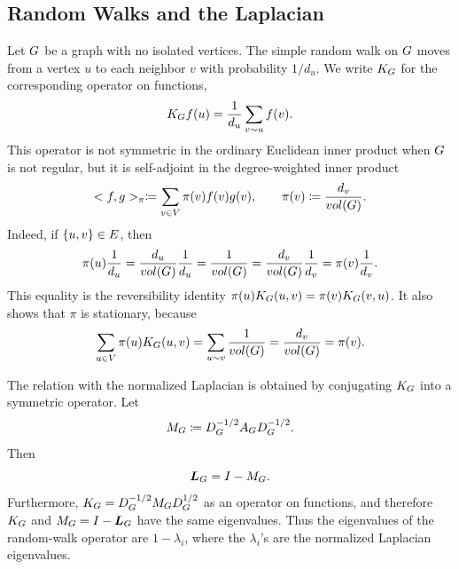 \subsection{Random Walks and the Laplacian}
\label{subsec:laplacian-random-walks}

Let \(G\) be a graph with no isolated vertices. The simple random walk on \(G\) moves from a vertex \(u\) to each neighbor \(v\) with probability \(1/d_u\). We write \(K_{G}\) for the corresponding operator on functions,
\begin{equation}
	K_{G} f(u)=\frac{1}{d_u}\sum_{v\sim u}f(v).
\end{equation}
This operator is not symmetric in the ordinary Euclidean inner product when \(G\) is not regular, but it is self-adjoint in the degree-weighted inner product
\begin{equation}
	< f,g>_{\pi}\coloneqq \sum_{v\in V}\pi(v)f(v)g(v),
	\qquad
	\pi(v)\coloneqq \frac{d_v}{vol(G)}.
\end{equation}
Indeed, if \(\{u,v\}\in E\), then
\begin{equation}
	\pi(u)\frac{1}{d_u}=\frac{d_u}{vol(G)}\frac{1}{d_u}=\frac{1}{vol(G)}=\frac{d_v}{vol(G)}\frac{1}{d_v}=\pi(v)\frac{1}{d_v}.
\end{equation}
This equality is the reversibility identity \(\pi(u)K_{G}(u,v)=\pi(v)K_{G}(v,u)\). It also shows that \(\pi\) is stationary, because
\begin{equation}
	\sum_{u\in V}\pi(u)K_{G}(u,v)
	=
	\sum_{u\sim v}\frac{1}{vol(G)}
	=
	\frac{d_v}{vol(G)}
	=
	\pi(v).
\end{equation}

The relation with the normalized Laplacian is obtained by conjugating \(K_{G}\) into a symmetric operator. Let
\begin{equation}
	M_{G}\coloneqq D_{G}^{-1/2}A_{G}D_{G}^{-1/2}.
\end{equation}
Then
\begin{equation}
	\boldsymbol{L}_{G}=I-M_{G}.
\end{equation}
Furthermore, \(K_{G}=D_{G}^{-1/2}M_{G}D_{G}^{1/2}\) as an operator on functions, and therefore \(K_{G}\) and \(M_{G}=I-\boldsymbol{L}_{G}\) have the same eigenvalues. Thus the eigenvalues of the random-walk operator are \(1-\lambda_i\), where the \(\lambda_i\)'s are the normalized Laplacian eigenvalues.

